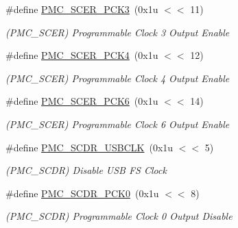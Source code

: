\begin{DoxyCompactItemize}
\#define \mbox{\hyperlink{group__SAMS70__PMC_gad4a2c7840a746ac64b9bed22ff683572}{P\+M\+C\+\_\+\+S\+C\+E\+R\+\_\+\+P\+C\+K3}}~(0x1u $<$$<$ 11)
\begin{DoxyCompactList}\small\item\em (P\+M\+C\+\_\+\+S\+C\+ER) Programmable Clock 3 Output Enable \end{DoxyCompactList}\item 
\mbox{\label{group__SAMS70__PMC_ga439a7f068f5851a2545663aafd715301}} 
\#define \mbox{\hyperlink{group__SAMS70__PMC_ga439a7f068f5851a2545663aafd715301}{P\+M\+C\+\_\+\+S\+C\+E\+R\+\_\+\+P\+C\+K4}}~(0x1u $<$$<$ 12)
\begin{DoxyCompactList}\small\item\em (P\+M\+C\+\_\+\+S\+C\+ER) Programmable Clock 4 Output Enable \end{DoxyCompactList}\item 
\mbox{\label{group__SAMS70__PMC_ga9a55e8adfd2f36577018f765a62e2885}} 
\#define \mbox{\hyperlink{group__SAMS70__PMC_ga9a55e8adfd2f36577018f765a62e2885}{P\+M\+C\+\_\+\+S\+C\+E\+R\+\_\+\+P\+C\+K6}}~(0x1u $<$$<$ 14)
\begin{DoxyCompactList}\small\item\em (P\+M\+C\+\_\+\+S\+C\+ER) Programmable Clock 6 Output Enable \end{DoxyCompactList}\item 
\mbox{\label{group__SAMS70__PMC_gaf181035ac0c43413fd5a5c42fb3ee734}} 
\#define \mbox{\hyperlink{group__SAMS70__PMC_gaf181035ac0c43413fd5a5c42fb3ee734}{P\+M\+C\+\_\+\+S\+C\+D\+R\+\_\+\+U\+S\+B\+C\+LK}}~(0x1u $<$$<$ 5)
\begin{DoxyCompactList}\small\item\em (P\+M\+C\+\_\+\+S\+C\+DR) Disable U\+SB FS Clock \end{DoxyCompactList}\item 
\mbox{\label{group__SAMS70__PMC_ga9369a0afa9e84879986ef3520e5c336f}} 
\#define \mbox{\hyperlink{group__SAMS70__PMC_ga9369a0afa9e84879986ef3520e5c336f}{P\+M\+C\+\_\+\+S\+C\+D\+R\+\_\+\+P\+C\+K0}}~(0x1u $<$$<$ 8)
\begin{DoxyCompactList}\small\item\em (P\+M\+C\+\_\+\+S\+C\+DR) Programmable Clock 0 Output Disable \end{DoxyCompactList}\item 
$$
\end{DoxyCompactItemize}
